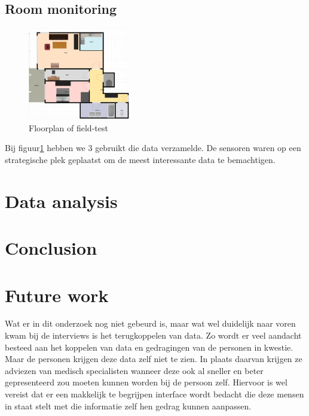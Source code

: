 \documentclass{below-ext}
\begin{document}
\subsection{Room monitoring}
\begin{figure}
\label{fig:floorplan}
\includegraphics[width=0.4\textwidth]{floorplan.png}
\caption{Floorplan of field-test}
\end{figure}
Bij figuur\ref{fig:floorplan} hebben we 3 gebruikt die data verzamelde. De sensoren waren op een strategische plek geplaatst om de meest interessante data te bemachtigen.
\section{Data analysis}
\section{Conclusion}

\section{Future work}
Wat er in dit onderzoek nog niet gebeurd is, maar wat wel duidelijk naar voren kwam bij de interviews is het terugkoppelen van data. Zo wordt er veel aandacht besteed aan het koppelen van data en gedragingen van de personen in kwestie. Maar de personen krijgen deze data zelf niet te zien. In plaats daarvan krijgen ze adviezen van medisch specialisten wanneer deze ook al sneller en beter gepresenteerd zou moeten kunnen worden bij de persoon zelf. Hiervoor is wel vereist dat er een makkelijk te begrijpen interface wordt bedacht die deze mensen in staat stelt met die informatie zelf hen gedrag kunnen aanpassen.
\balance


\end{document}
